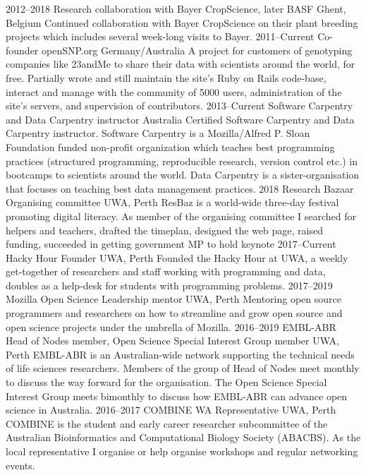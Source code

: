 \documentclass[]{friggeri-cv} %
\begin{document}
\begin{entrylist}
\entry
{2012--2018}
{Research collaboration with Bayer CropScience, later BASF}
{Ghent, Belgium}
{Continued collaboration with Bayer CropScience on their plant breeding projects which includes several week-long visits to Bayer.}
\entry
{2011--Current}
{Co-founder openSNP.org}
{Germany/Australia}
{A project for customers of genotyping companies like 23andMe to share their data with scientists around the world, for free. Partially wrote and still maintain the site's Ruby on Rails code-base, interact and manage with the community of 5000 users, administration of the site's servers, and supervision of contributors.}
\entry
{2013--Current}
{Software Carpentry and Data Carpentry instructor}
{Australia}
{Certified Software Carpentry and Data Carpentry instructor. Software Carpentry is a Mozilla/Alfred P. Sloan Foundation funded non-profit organization which teaches best programming practices (structured programming, reproducible research, version control etc.) in bootcamps to scientists around the world. Data Carpentry is a sister-organisation that focuses on teaching best data management practices.}
\entry
{2018}
{Research Bazaar Organising committee}
{UWA, Perth}
{ResBaz is a world-wide three-day festival promoting digital literacy. As member of the organising committee I searched for helpers and teachers, drafted the timeplan, designed the web page, raised funding, succeeded in getting government MP to hold keynote}
\entry
{2017--Current}
{Hacky Hour Founder}
{UWA, Perth}
{Founded the Hacky Hour at UWA, a weekly get-together of researchers and staff working with programming and data, doubles as a help-desk for students with programming problems.}
\entry
{2017--2019}
{Mozilla Open Science Leadership mentor}
{UWA, Perth}
{Mentoring open source programmers and researchers on how to streamline and grow open source and open science projects under the umbrella of Mozilla.}
\entry
{2016--2019}
{EMBL-ABR Head of Nodes member, Open Science Special Interest Group member}
{UWA, Perth}
{EMBL-ABR is an Australian-wide network supporting the technical needs of life sciences researchers. Members of the group of Head of Nodes meet monthly to discuss the way forward for the organisation. The Open Science Special Interest Group meets bimonthly to discuss how EMBL-ABR can advance open science in Australia.}
\entry
{2016--2017}
{COMBINE WA Representative}
{UWA, Perth}
{COMBINE is the student and early career researcher subcommittee of the Australian Bioinformatics and Computational Biology Society (ABACBS). As the local representative I organise or help organise workshops and regular networking events.}
\end{entrylist}
\end{document}
